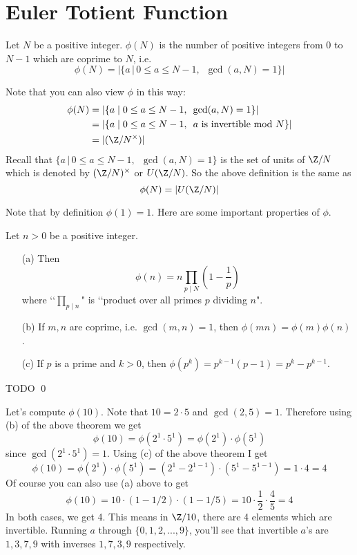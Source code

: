 \section{Euler Totient Function}

\begin{defn}
Let $N$ be a positive integer. $\phi(N)$ is the number of positive
integers from $0$ to $N-1$ which are coprime to $N$, i.e.
\[
\phi(N) = | \{ a \,|\, 0 \leq a \leq N - 1, \,\,\,\gcd(a,N) = 1\} |
\]
\end{defn}

Note that you can also view $\phi$ in this way:
\begin{align*}
\phi(N) 
&= | \{ a \mid 0 \leq a \leq N - 1, \,\,\,\gcd(a,N) = 1\} | \\
&= | \{ a \mid 0 \leq a \leq N - 1, \,\,\, a \text{ is invertible mod } N\}|\\
&= | (\Z/N^\times) |
\end{align*}
Recall that
$\{ a \,|\, 0 \leq a \leq N - 1, \,\,\,\gcd(a,N) = 1\}$
is the set of units of $\Z/N$ which is denoted by $(\Z/N)^\times$ or $U(\Z/N)$.
So the above definition is the same as
\[
\phi(N) = | U(\Z/N) |
\]

Note that by definition $\phi(1) = 1$.
Here are some important properties of $\phi$.

\begin{prop} Let $n > 0$ be a positive integer.
  \begin{enumerate}[topsep=0in, nosep]
  \item[\textnormal{(a)}]
    Then
    \[
    \phi(n) = n \prod_{p \mid N} \left( 1 -  \frac{1}{p} \right)
    \]
    where \lq\lq $\prod_{p \mid n}$"
    is
    \lq\lq product over all primes $p$ dividing $n$".
  \item[\textnormal{(b)}] If $m,n$ are coprime, i.e. $\gcd(m,n)=1$, then
    $\phi(mn) = \phi(m)\phi(n)$.
  \item[\textnormal{(c)}]
    If $p$ is a prime and $k > 0$, then
    $\phi(p^k) = p^{k-1}(p-1) = p^k - p^{k-1}$.
  \end{enumerate}
\end{prop}
\proof
TODO
\qed

Let's compute $\phi(10)$.
Note that $10 = 2 \cdot 5$ and $\gcd(2,5) = 1$.
Therefore using (b) of the above theorem we get
\[
\phi(10) = \phi(2^1 \cdot 5^1) = \phi(2^1) \cdot \phi(5^1)
\]
since $\gcd(2^1 \cdot 5^1) = 1$.
Using (c) of the above theorem I get
\[
\phi(10) = \phi(2^1) \cdot \phi(5^1)
= (2^1 - 2^{1-1}) \cdot (5^1 - 5^{1-1}) = 1 \cdot 4 = 4
\]
Of course you can also use (a) above to get
\[
\phi(10) = 10 \cdot (1 - 1/2) \cdot (1 - 1/5)
= 10 \cdot \frac{1}{2} \cdot \frac{4}{5} = 4
\]
In both cases, we get 4.
This means in $\Z/10$, there are 4 elements which are invertible.
Running $a$ through $\{0, 1, 2, ..., 9\}$,
you'll see that invertible $a$'s are $1, 3, 7, 9$
with inverses $1, 7, 3, 9$ respectively.

